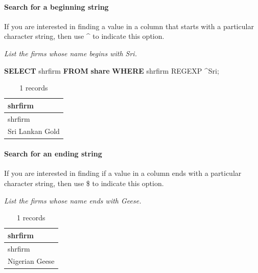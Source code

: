 \documentclass[
]{article}
\newenvironment{Shaded}{\begin{snugshade}}{\end{snugshade}}
\newcommand{\KeywordTok}[1]{\textcolor[rgb]{0.13,0.29,0.53}{\textbf{#1}}}
\newcommand{\NormalTok}[1]{#1}
\newcommand{\StringTok}[1]{\textcolor[rgb]{0.31,0.60,0.02}{#1}}
\begin{document}
\hypertarget{search-for-a-beginning-string}{%
\paragraph{Search for a beginning
string}\label{search-for-a-beginning-string}}

If you are interested in finding a value in a column that starts with a
particular character string, then use \^{} to indicate this option.

\emph{List the firms whose name begins with Sri.}

\begin{Shaded}
\begin{Highlighting}[]
\KeywordTok{SELECT}\NormalTok{ shrfirm }\KeywordTok{FROM} \KeywordTok{share} \KeywordTok{WHERE}\NormalTok{ shrfirm REGEXP }\StringTok{\textquotesingle{}\^{}Sri\textquotesingle{}}\NormalTok{;}
\end{Highlighting}
\end{Shaded}

\begin{longtable}[]{@{}l@{}}
\caption{1 records}\tabularnewline
\toprule()
shrfirm \\
\midrule()
\endfirsthead
\toprule()
shrfirm \\
\midrule()
\endhead
Sri Lankan Gold \\
\bottomrule()
\end{longtable}

\hypertarget{search-for-an-ending-string}{%
\paragraph{Search for an ending
string}\label{search-for-an-ending-string}}

If you are interested in finding if a value in a column ends with a
particular character string, then use \$ to indicate this option.

\emph{List the firms whose name ends with Geese.}

\begin{Shaded}
\end{Shaded}

\begin{longtable}[]{@{}l@{}}
\caption{1 records}\tabularnewline
\toprule()
shrfirm \\
\midrule()
\endfirsthead
\toprule()
shrfirm \\
\midrule()
\endhead
Nigerian Geese \\
\bottomrule()
\end{longtable}
\end{document}
